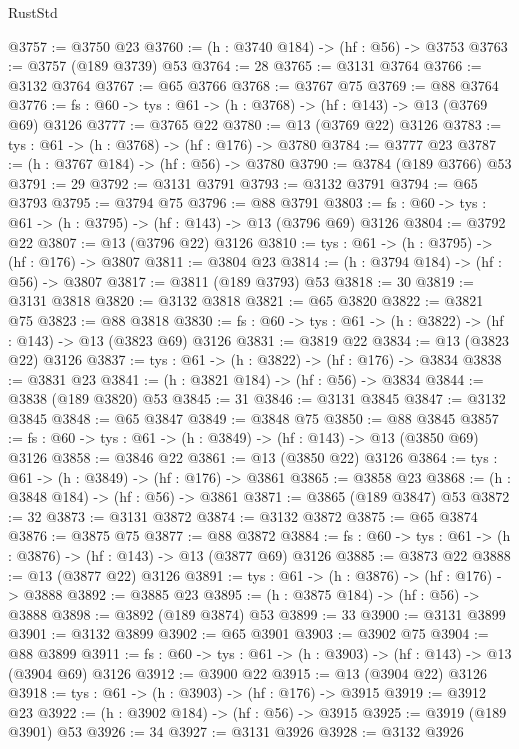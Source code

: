 \begin{lexlean}{RustStd}
\begin{coremodule}
@3757 := @3750 @23
@3760 := (h : @3740 @184) -> (hf : @56) -> @3753
@3763 := @3757 (@189 @3739) @53
@3764 := 28
@3765 := @3131 @3764
@3766 := @3132 @3764
@3767 := @65 @3766
@3768 := @3767 @75
@3769 := @88 @3764
@3776 := {fs : @60} -> {tys : @61} -> (h : @3768) -> (hf : @143) -> @13 (@3769 @69) @3126
@3777 := @3765 @22
@3780 := @13 (@3769 @22) @3126
@3783 := {tys : @61} -> (h : @3768) -> (hf : @176) -> @3780
@3784 := @3777 @23
@3787 := (h : @3767 @184) -> (hf : @56) -> @3780
@3790 := @3784 (@189 @3766) @53
@3791 := 29
@3792 := @3131 @3791
@3793 := @3132 @3791
@3794 := @65 @3793
@3795 := @3794 @75
@3796 := @88 @3791
@3803 := {fs : @60} -> {tys : @61} -> (h : @3795) -> (hf : @143) -> @13 (@3796 @69) @3126
@3804 := @3792 @22
@3807 := @13 (@3796 @22) @3126
@3810 := {tys : @61} -> (h : @3795) -> (hf : @176) -> @3807
@3811 := @3804 @23
@3814 := (h : @3794 @184) -> (hf : @56) -> @3807
@3817 := @3811 (@189 @3793) @53
@3818 := 30
@3819 := @3131 @3818
@3820 := @3132 @3818
@3821 := @65 @3820
@3822 := @3821 @75
@3823 := @88 @3818
@3830 := {fs : @60} -> {tys : @61} -> (h : @3822) -> (hf : @143) -> @13 (@3823 @69) @3126
@3831 := @3819 @22
@3834 := @13 (@3823 @22) @3126
@3837 := {tys : @61} -> (h : @3822) -> (hf : @176) -> @3834
@3838 := @3831 @23
@3841 := (h : @3821 @184) -> (hf : @56) -> @3834
@3844 := @3838 (@189 @3820) @53
@3845 := 31
@3846 := @3131 @3845
@3847 := @3132 @3845
@3848 := @65 @3847
@3849 := @3848 @75
@3850 := @88 @3845
@3857 := {fs : @60} -> {tys : @61} -> (h : @3849) -> (hf : @143) -> @13 (@3850 @69) @3126
@3858 := @3846 @22
@3861 := @13 (@3850 @22) @3126
@3864 := {tys : @61} -> (h : @3849) -> (hf : @176) -> @3861
@3865 := @3858 @23
@3868 := (h : @3848 @184) -> (hf : @56) -> @3861
@3871 := @3865 (@189 @3847) @53
@3872 := 32
@3873 := @3131 @3872
@3874 := @3132 @3872
@3875 := @65 @3874
@3876 := @3875 @75
@3877 := @88 @3872
@3884 := {fs : @60} -> {tys : @61} -> (h : @3876) -> (hf : @143) -> @13 (@3877 @69) @3126
@3885 := @3873 @22
@3888 := @13 (@3877 @22) @3126
@3891 := {tys : @61} -> (h : @3876) -> (hf : @176) -> @3888
@3892 := @3885 @23
@3895 := (h : @3875 @184) -> (hf : @56) -> @3888
@3898 := @3892 (@189 @3874) @53
@3899 := 33
@3900 := @3131 @3899
@3901 := @3132 @3899
@3902 := @65 @3901
@3903 := @3902 @75
@3904 := @88 @3899
@3911 := {fs : @60} -> {tys : @61} -> (h : @3903) -> (hf : @143) -> @13 (@3904 @69) @3126
@3912 := @3900 @22
@3915 := @13 (@3904 @22) @3126
@3918 := {tys : @61} -> (h : @3903) -> (hf : @176) -> @3915
@3919 := @3912 @23
@3922 := (h : @3902 @184) -> (hf : @56) -> @3915
@3925 := @3919 (@189 @3901) @53
@3926 := 34
@3927 := @3131 @3926
@3928 := @3132 @3926

\end{coremodule}
\end{lexlean}
